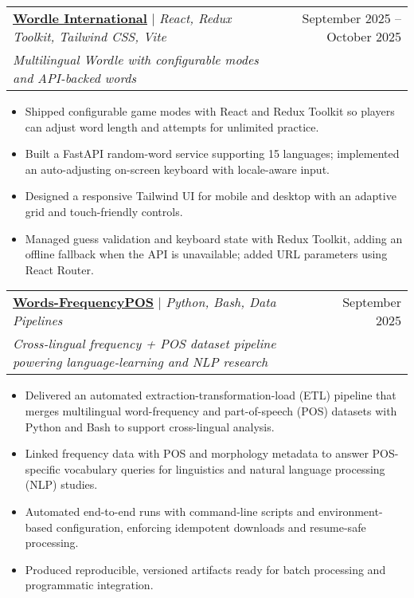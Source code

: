 \documentclass[letterpaper,11pt]{article}
\makeatletter
\newcommand{\resumeItem}[1]{
  \item\small{
    {#1 \vspace{-2pt}}
  }
}
\newcommand{\resumeProjectHeading}[3]{
    \item
    \begin{tabular*}{0.97\textwidth}{l@{\extracolsep{\fill}}r}
      \small#1 & #2 \\
      \textit{\small #3} & \\
    \end{tabular*}\vspace{-7pt}
}
\newcommand{\resumeItemListStart}{\begin{itemize}}
\newcommand{\resumeItemListEnd}{\end{itemize}\vspace{-5pt}}
\makeatother
\begin{document}
\resumeProjectHeading
{\textbf{\href{https://wordle-international.netlify.app}{\underline{Wordle International}}} $|$ \emph{React, Redux Toolkit, Tailwind CSS, Vite}}{September 2025 -- October 2025}{Multilingual Wordle with configurable modes and API-backed words}
\resumeItemListStart
\resumeItem{Shipped configurable game modes with React and Redux Toolkit so players can adjust word length and attempts for unlimited practice.}
\resumeItem{Built a FastAPI random-word service supporting 15 languages; implemented an auto-adjusting on-screen keyboard with locale-aware input.}
\resumeItem{Designed a responsive Tailwind UI for mobile and desktop with an adaptive grid and touch-friendly controls.}
\resumeItem{Managed guess validation and keyboard state with Redux Toolkit, adding an offline fallback when the API is unavailable; added URL parameters using React Router.}
\resumeItemListEnd

\resumeProjectHeading
{\textbf{\href{https://github.com/vsharha/Words-FrequencyPOS}{\underline{Words-FrequencyPOS}}} $|$ \emph{Python, Bash, Data Pipelines}}{September 2025}{Cross-lingual frequency + POS dataset pipeline powering language-learning and NLP research}
\resumeItemListStart
\resumeItem{Delivered an automated extraction-transformation-load (ETL) pipeline that merges multilingual word-frequency and part-of-speech (POS) datasets with Python and Bash to support cross-lingual analysis.}
\resumeItem{Linked frequency data with POS and morphology metadata to answer POS-specific vocabulary queries for linguistics and natural language processing (NLP) studies.}
\resumeItem{Automated end-to-end runs with command-line scripts and environment-based configuration, enforcing idempotent downloads and resume-safe processing.}
\resumeItem{Produced reproducible, versioned artifacts ready for batch processing and programmatic integration.}
\resumeItemListEnd
\end{document}
